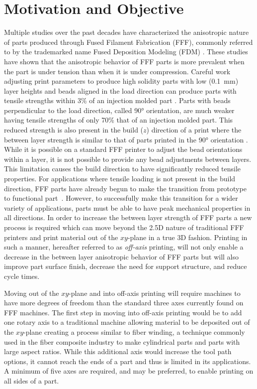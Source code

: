 \documentclass[main.tex]{subfiles}
\begin{document}
\chapter{Motivation and Objective}
Multiple studies over the past decades have characterized the anisotropic nature of parts produced through Fused Filament Fabrication (FFF), commonly referred to by the trademarked name Fused Deposition Modeling (FDM) \cite{Ahn2002a, Cantrell2016}.
%
%
These studies have shown that the anisotropic behavior of FFF parts is more prevalent when the part is under tension than when it is under compression.
Careful work adjusting print parameters to produce high solidity parts with low (\SI{0.1}{mm}) layer heights and beads aligned in the load direction can produce parts with tensile strengths within 3\% of an injection molded part \cite{Koch2016, Koch2017}.
Parts with beads perpendicular to the load direction, called \ang{90} orientation, are much weaker having tensile strengths of only 70\% that of an injection molded part.
This reduced strength is also present in the build ($z$) direction of a print where the between layer strength is similar to that of parts printed in the \ang{90} orientation \cite{Riddick2016}.
While it is possible on a standard FFF printer to adjust the bead orientations within a layer, it is not possible to provide any bead adjustments between layers.
This limitation causes the build direction to have significantly reduced tensile properties.
For applications where tensile loading is not present in the build direction, FFF parts have already begun to make the transition from prototype to functional part~\cite{Fathom2014}.
However, to successfully make this transition for a wider variety of applications, parts must be able to have peak mechanical properties in all directions.
In order to increase the between layer strength of FFF parts a new process is required which can move beyond the 2.5D nature of traditional FFF printers and print material out of the $xy$\nobreakdash-plane in a true 3D fashion.
Printing in such a manner, hereafter referred to as \emph{off-axis} printing, will not only enable a decrease in the between layer anisotropic behavior of FFF parts but will also improve part surface finish, decrease the need for support structure, and reduce cycle times.

Moving out of the $xy$\nobreakdash-plane and into off-axis printing will require machines to have more degrees of freedom than the standard three axes currently found on FFF machines.
The first step in moving into off-axis printing would be to add one rotary axis to a traditional machine allowing material to be deposited out of the $xy$\nobreakdash-plane creating a process similar to fiber winding, a technique commonly used in the fiber composite industry to make cylindrical parts and parts with large aspect ratios. While this additional axis would increase the tool path options, it cannot reach the ends of a part and thus is limited in its applications. A minimum of five axes are required, and may be preferred, to enable printing on all sides of a part.
\end{document}
